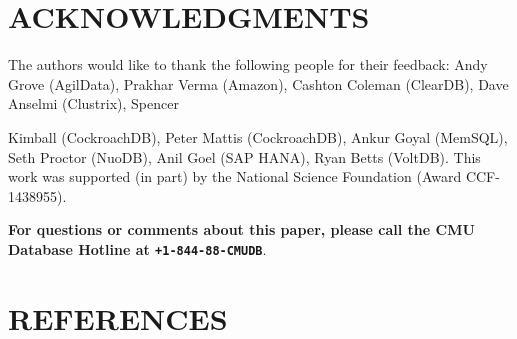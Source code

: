 \documentclass[a4paper,12pt,notitlepage,twoside,openright]{article}
\begin{document}
\hypertarget{acknowledgments}{%
\section*{ACKNOWLEDGMENTS}\label{acknowledgments}}

The authors would like to thank the following people for their feedback:
Andy Grove (AgilData), Prakhar Verma (Amazon), Cashton Coleman
(ClearDB), Dave Anselmi (Clustrix), Spencer

Kimball (CockroachDB), Peter Mattis (CockroachDB), Ankur Goyal (MemSQL),
Seth Proctor (NuoDB), Anil Goel (SAP HANA), Ryan Betts (VoltDB). This
work was supported (in part) by the National Science Foundation (Award
CCF-1438955).

\textbf{For questions or comments about this paper, please call the CMU Database
Hotline at \texttt{+1-844-88-CMUDB}}.

\hypertarget{references}{%
\section{REFERENCES}\label{references}}
\end{document}
